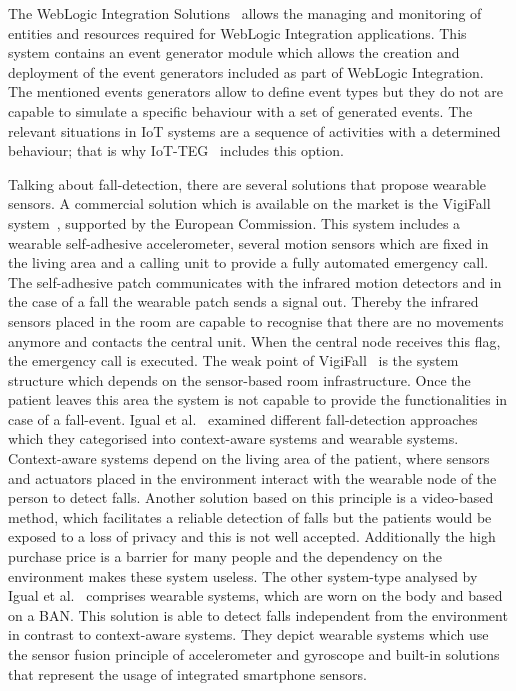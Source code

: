 \documentclass[conference]{IEEEtran}
\theoremstyle{definition}
\begin{document}
The WebLogic Integration Solutions~\cite{WebLogic:2016} allows the managing and monitoring of entities and resources required for
WebLogic Integration applications. This system contains an event generator module which allows the creation and deployment of the 
event generators included as part of WebLogic Integration. The mentioned events generators allow to define event types
but they do not are capable to simulate a specific behaviour with a set of generated events. The relevant situations in
IoT systems are a sequence of activities with a determined behaviour; that is why IoT-TEG~\cite{TesisGutierrez2017,Gutierrez2017} 
includes this option.

Talking about fall-detection, there are several solutions that propose wearable sensors. A commercial solution which is 
available on the market is the VigiFall system~\cite{Vigilio,EuropeanCommission2013}, supported by the European Commission. This system 
includes a wearable self-adhesive accelerometer, several motion sensors which are fixed in the living area and a calling unit to provide 
a fully automated emergency call. The self-adhesive patch communicates with the infrared motion detectors and in the case of a fall the 
wearable patch sends a signal out. Thereby the infrared sensors placed in the room are capable to recognise that there are no movements anymore and 
contacts the central unit. When the central node receives this flag, the emergency call is executed. The weak point of VigiFall~\cite{Vigilio} is 
the system structure which depends on the sensor-based room infrastructure. Once the patient leaves this area the system is not capable 
to provide the functionalities in case of a fall-event. Igual et al.~\cite{Igual2013} examined different fall-detection approaches which they 
categorised into context-aware systems and wearable systems. Context-aware systems depend on the living area of the patient, where 
sensors and actuators placed in the environment interact with the wearable node of the person to detect falls. Another solution based 
on this principle is a video-based method, which facilitates a reliable detection of falls but the patients would be exposed to a 
loss of privacy and this is not well accepted. Additionally the high purchase price is a barrier for many people and the dependency 
on the environment makes these system useless. The other system-type analysed by Igual et al.~\cite{Igual2013} comprises wearable systems, which 
are worn on the body and based on a BAN. This solution is able to detect falls independent from the environment in contrast to 
context-aware systems. They depict wearable systems which use the sensor fusion principle of accelerometer and gyroscope 
and built-in solutions that represent the usage of integrated smartphone sensors.
\end{document}
